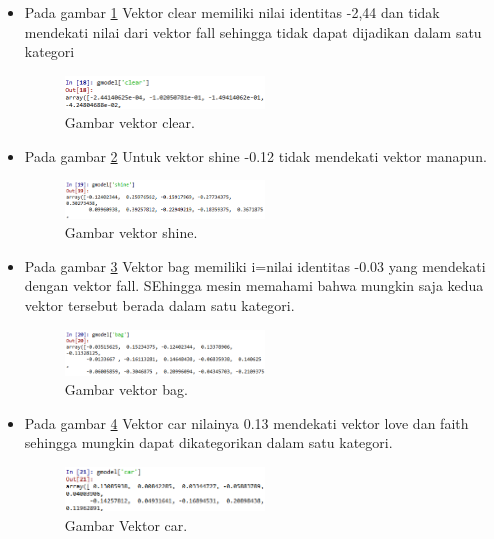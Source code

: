 \begin{enumerate}
\begin{itemize}
\item Pada gambar \ref{5clear} Vektor clear memiliki nilai identitas -2,44 dan tidak mendekati nilai dari vektor fall sehingga tidak dapat dijadikan dalam satu kategori
	\begin{figure}[ht]
	\centerline{\includegraphics[width=0.5\textwidth]{figures/chapter5/5clear.png}}
	\caption{Gambar vektor clear.}	
	\label{5clear}
	\end{figure}

\item Pada gambar \ref{6shine} Untuk vektor shine -0.12 tidak mendekati vektor manapun.
	\begin{figure}[ht]
	\centerline{\includegraphics[width=0.5\textwidth]{figures/chapter5/6shine.png}}
	\caption{Gambar vektor shine.}	
	\label{6shine}
	\end{figure}

\item Pada gambar \ref{7bag} Vektor bag memiliki i=nilai identitas -0.03 yang mendekati dengan vektor fall. SEhingga mesin memahami bahwa mungkin saja kedua vektor tersebut berada dalam satu kategori.
	\begin{figure}[ht]
	\centerline{\includegraphics[width=0.5\textwidth]{figures/chapter5/7bag.png}}
	\caption{Gambar vektor bag.}	
	\label{7bag}
	\end{figure}
	

\item Pada gambar \ref{8car} Vektor car nilainya 0.13 mendekati vektor love dan faith sehingga mungkin dapat dikategorikan dalam satu kategori.
	\begin{figure}[ht]
	\centerline{\includegraphics[width=0.5\textwidth]{figures/chapter5/8car.png}}
	\caption{Gambar Vektor car.}	
	\label{8car}
	\end{figure}



\end{itemize}
\end{enumerate}
